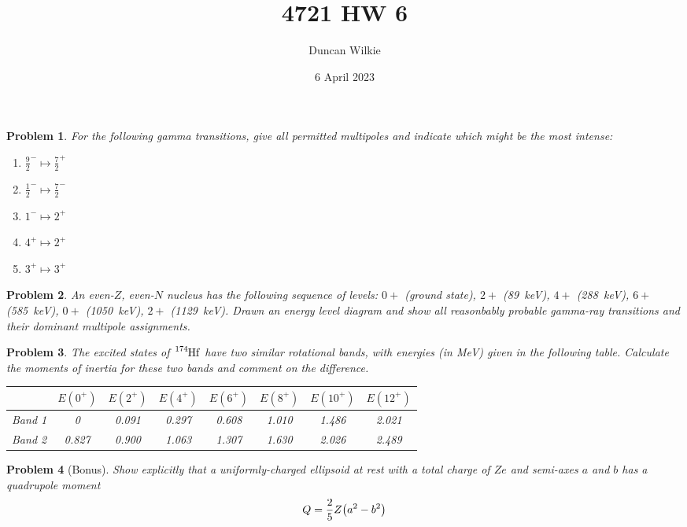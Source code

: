 \documentclass{article}
\title{4721 HW 6}
\author{Duncan Wilkie}
\date{6 April 2023}
\newtheorem{plm}{Problem}
\begin{document}
\maketitle

\begin{plm}
  For the following gamma transitions, give all permitted multipoles and indicate which might be the most intense:
  \begin{enumerate}
  \item $\frac{9}{2}^{-} \mapsto \frac{7}{2}^{+}$
  \item $\frac{1}{2}^{-} \mapsto \frac{7}{2}^{-}$
  \item ${1}^{-} \mapsto 2^{+}$
  \item $4^{+} \mapsto 2^{+}$
  \item $3^{+} \mapsto 3^{+}$
  \end{enumerate}
\end{plm}
\begin{plm}
  An even-$Z$, even-$N$ nucleus has the following sequence of levels: $0+$ (ground state), $2+$ (\SI{89}{keV}), $4+$ (\SI{288}{keV}),
  $6+$ (\SI{585}{keV}), $0+$ (\SI{1050}{keV}), $2+$ (\SI{1129}{keV}).
  Drawn an energy level diagram and show all reasonbably probable gamma-ray transitions and their dominant multipole assignments.
\end{plm}
\begin{plm}
  The excited states of $\ce{^{174}Hf}$ have two similar rotational bands, with energies (in \si{MeV}) given in the following table.
  Calculate the moments of inertia for these two bands and comment on the difference.
  \begin{table}[H]
    \centering
    \begin{tabular}{|c|c|c|c|c|c|c|c|}
      \hline
      & $E(0^{+})$ & $E(2^{+})$ & $E(4^{+})$ & $E(6^{+})$ & $E(8^{+})$ & $E(10^{+})$ & $E(12^{+})$ \\
      \hline
      Band 1 & 0 & 0.091 & 0.297 & 0.608 & 1.010 & 1.486 & 2.021 \\
      \hline
      Band 2 & 0.827 & 0.900 & 1.063 & 1.307 & 1.630 & 2.026 & 2.489 \\
      \hline
    \end{tabular}
  \end{table}
\end{plm}
\begin{plm}[Bonus]
  Show explicitly that a uniformly-charged ellipsoid at rest with a total charge of $Ze$ and semi-axes $a$ and $b$ has a quadrupole moment
  \[
    Q = \frac{2}{5}Z\qty(a^{2} - b^{2})
  \]
\end{plm}
\end{document}
